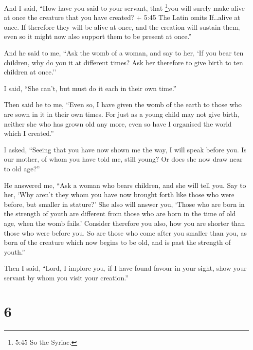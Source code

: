  And I said, ``How have you said to your servant, that
\footnote{5:45 So the Syriac.}you will surely make alive at once the
creature that you have created? + 5:45 The Latin omits If\ldots alive at
once. If therefore they will be alive at once, and the creation will
sustain them, even so it might now also support them to be present at
once.''

 And he said to me, ``Ask the womb of a woman, and say to
her, `If you bear ten children, why do you it at different times? Ask
her therefore to give birth to ten children at once.''

 I said, ``She can't, but must do it each in their own
time.''

 Then said he to me, ``Even so, I have given the womb of
the earth to those who are sown in it in their own times. 
For just as a young child may not give birth, neither she who has grown
old any more, even so have I organised the world which I created.''

 I asked, ``Seeing that you have now shown me the way, I
will speak before you. Is our mother, of whom you have told me, still
young? Or does she now draw near to old age?''

 He answered me, ``Ask a woman who bears children, and she
will tell you.  Say to her, `Why aren't they whom you have
now brought forth like those who were before, but smaller in stature?'
 She also will answer you, `Those who are born in the
strength of youth are different from those who are born in the time of
old age, when the womb fails.'  Consider therefore you
also, how you are shorter than those who were before you. 
So are those who come after you smaller than you, as born of the
creature which now begins to be old, and is past the strength of
youth.''

 Then I said, ``Lord, I implore you, if I have found favour
in your sight, show your servant by whom you visit your creation.''

\hypertarget{section-5}{%
\section{6}\label{section-5}}

